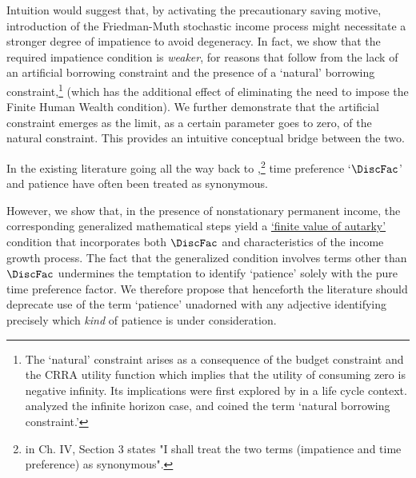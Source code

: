 \documentclass[BufferStockTheory]{subfiles}
\begin{document}
Intuition would suggest that, by activating the precautionary saving motive, introduction of the Friedman-Muth stochastic income process might necessitate a stronger degree of impatience to avoid degeneracy. In fact, we show that the required impatience condition is \textit{weaker}, for reasons that follow from the lack of an artificial borrowing constraint and the presence of a `natural' borrowing constraint,\footnote{The `natural' constraint arises as a consequence of the budget constraint and the CRRA utility function which implies that the utility of consuming zero is negative infinity.  Its implications were first explored by \cite{zeldesStochastic} in a life cycle context. \cite{carroll:brookings} analyzed the infinite horizon case, and \cite{aiyagari:ge} coined the term `natural borrowing constraint.'} (which has the additional effect of eliminating the need to impose the Finite Human Wealth condition). We further demonstrate that the artificial constraint emerges as the limit, as a certain parameter goes to zero, of the natural constraint. This provides an intuitive conceptual bridge between the two.

In the existing literature going all the way back to \cite{fisherInterestTheory},\footnote{\cite{fisherInterestTheory} in Ch. IV, Section 3 states "I shall treat the two terms (impatience and time preference) as synonymous".} time preference `$\DiscFac$' and patience have often been treated as synonymous. %



However, we show that, in the presence of nonstationary permanent income, the corresponding generalized mathematical steps yield a \hyperlink{FVAC}{`finite value of autarky'} condition that incorporates both $\DiscFac$ and characteristics of the income growth process. The fact that the generalized condition involves terms other than $\DiscFac$ undermines the temptation to identify `patience' solely with the pure time preference factor.  We therefore propose that henceforth the literature should deprecate use of the term `patience' unadorned with any adjective identifying precisely which \textit{kind} of patience is under consideration.
\end{document}
